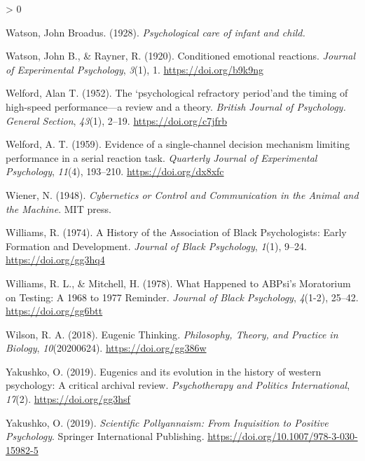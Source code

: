 \documentclass[
  oneside,
  12pt]{crumpbook}
\newlength{\cslhangindent}
\newenvironment{CSLReferences}[2] %
 {%
  \setlength{\parindent}{0pt}
  \ifodd #1 \everypar{\setlength{\hangindent}{\cslhangindent}}\ignorespaces\fi
  \ifnum #2 > 0
  \setlength{\parskip}{#2\baselineskip}
  \fi
 }%
 {}
\begin{document}
\begin{CSLReferences}{1}{0}
\leavevmode\hypertarget{ref-watsonPsychologicalCareInfant1928}{}%
Watson, John Broadus. (1928). \emph{Psychological care of infant and child.}

\leavevmode\hypertarget{ref-watsonConditionedEmotionalReactions1920}{}%
Watson, John B., \& Rayner, R. (1920). Conditioned emotional reactions. \emph{Journal of Experimental Psychology}, \emph{3}(1), 1. \url{https://doi.org/b9k9ng}

\leavevmode\hypertarget{ref-welfordPsychologicalRefractoryPeriod1952}{}%
Welford, Alan T. (1952). The `psychological refractory period'and the timing of high-speed performance---a review and a theory. \emph{British Journal of Psychology. General Section}, \emph{43}(1), 2--19. \url{https://doi.org/c7jfrb}

\leavevmode\hypertarget{ref-welfordEvidenceSinglechannelDecision1959}{}%
Welford, A. T. (1959). Evidence of a single-channel decision mechanism limiting performance in a serial reaction task. \emph{Quarterly Journal of Experimental Psychology}, \emph{11}(4), 193--210. \url{https://doi.org/dx8xfc}

\leavevmode\hypertarget{ref-wienerCyberneticsControlCommunication1948}{}%
Wiener, N. (1948). \emph{Cybernetics or {Control} and {Communication} in the {Animal} and the {Machine}}. {MIT press}.

\leavevmode\hypertarget{ref-williamsHistoryAssociationBlack1974}{}%
Williams, R. (1974). A {History} of the {Association} of {Black Psychologists}: {Early Formation} and {Development}. \emph{Journal of Black Psychology}, \emph{1}(1), 9--24. \url{https://doi.org/gg3hq4}

\leavevmode\hypertarget{ref-williamsWhatHappenedABPsi1978}{}%
Williams, R. L., \& Mitchell, H. (1978). What {Happened} to {ABPsi}'s {Moratorium} on {Testing}: {A} 1968 to 1977 {Reminder}. \emph{Journal of Black Psychology}, \emph{4}(1-2), 25--42. \url{https://doi.org/gg6btt}

\leavevmode\hypertarget{ref-wilsonEugenicThinking2018}{}%
Wilson, R. A. (2018). Eugenic {Thinking}. \emph{Philosophy, Theory, and Practice in Biology}, \emph{10}(20200624). \url{https://doi.org/gg386w}

\leavevmode\hypertarget{ref-yakushkoEugenicsItsEvolution2019}{}%
Yakushko, O. (2019). Eugenics and its evolution in the history of western psychology: {A} critical archival review. \emph{Psychotherapy and Politics International}, \emph{17}(2). \url{https://doi.org/gg3hsf}

\leavevmode\hypertarget{ref-yakushkoScientificPollyannaismInquisition2019}{}%
Yakushko, O. (2019). \emph{Scientific {Pollyannaism}: {From Inquisition} to {Positive Psychology}}. {Springer International Publishing}. \url{https://doi.org/10.1007/978-3-030-15982-5}


\end{CSLReferences}
\end{document}
